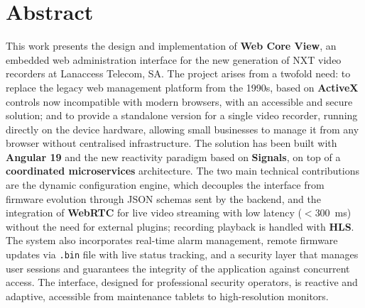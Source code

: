 \documentclass[12pt,a4paper,oneside]{report}
\begin{document}
\chapter*{Abstract}
This work presents the design and implementation of \textbf{Web Core View}, an embedded web administration interface for the new generation of NXT video recorders at Lanaccess Telecom, SA. The project arises from a twofold need: to replace the legacy web management platform from the 1990s, based on \textbf{ActiveX} controls now incompatible with modern browsers, with an accessible and secure solution; and to provide a standalone version for a single video recorder, running directly on the device hardware, allowing small businesses to manage it from any browser without centralised infrastructure. The solution has been built with \textbf{Angular 19} and the new reactivity paradigm based on \textbf{Signals}, on top of a \textbf{coordinated microservices} architecture. The two main technical contributions are the dynamic configuration engine, which decouples the interface from firmware evolution through JSON schemas sent by the backend, and the integration of \textbf{WebRTC} for live video streaming with low latency ($<$300~ms) without the need for external plugins; recording playback is handled with \textbf{HLS}. The system also incorporates real-time alarm management, remote firmware updates via \texttt{.bin} file with live status tracking, and a security layer that manages user sessions and guarantees the integrity of the application against concurrent access. The interface, designed for professional security operators, is reactive and adaptive, accessible from maintenance tablets to high-resolution monitors.
\newpage
\end{document}
